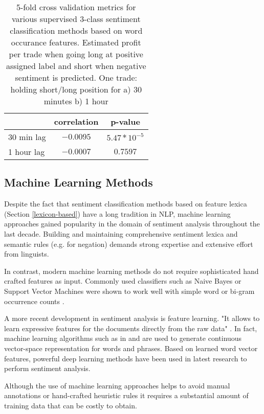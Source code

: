 \documentclass[a4paper,12pt]{article}%
\begin{document}
\begin{table} 
\centering
\captionsetup{justification=centering}
\begin{tabular}{ |l|c|c|}
\hline
 & correlation & p-value \\ \hline
30 min lag & $-0.0095$ & $5.47 * 10^{-5}$\\ \hline
1 hour lag & $-0.0007$ & $0.7597$ \\ \hline
\end{tabular}
\caption{5-fold cross validation metrics for various supervised 3-class sentiment classification methods based on word occurance features. Estimated profit per trade when going long at positive assigned label and short when negative sentiment is predicted. One trade: holding short/long position for a) 30 minutes b) 1 hour\label{table:bag-of-words-results}}
\end{table}

\subsection{Machine Learning Methods}
Despite the fact that sentiment classification methods based on feature lexica (Section \ref{lexicon-based}) have a long tradition in NLP, machine learning approaches gained popularity in the domain of sentiment analysis throughout the last decade. Building and maintaining comprehensive sentiment lexica and semantic rules (e.g. for negation) demands strong expertise and extensive effort from linguists.

In contrast, modern machine learning methods do not require sophisticated hand crafted features as input. Commonly used classifiers such as Naive Bayes or Support Vector Machines were shown to work well with simple word or bi-gram occurrence counts \citep{Pang2002}. 

A more recent development in sentiment analysis is feature learning. "It allows to learn expressive features for the documents directly from the raw data" \citep{Albertini2014}. In fact, machine learning algorithms such as in \citet{Socher2011a} and \citet{Maas2011} are used to generate continuous vector-space representation for words and phrases. Based on learned word vector features, powerful deep learning methods have been used in latest research to perform sentiment analysis.

Although the use of machine learning approaches helps to avoid manual annotations or hand-crafted heuristic rules it requires a substantial amount of training data that can be costly to obtain.
\end{document}
